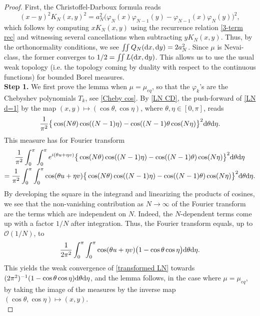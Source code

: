 \documentclass[a4paper,11pt]{article}
\numberwithin{equation}{section}
\theoremstyle{definition}
\newcommand{\rev}[1]{#1}
\newcommand{\eq}{\begin{equation}}
\newcommand{\qe}{\end{equation}}
\newcommand{\cO}{\mathcal{O}}
\renewcommand{\phi}{\varphi}
\renewcommand{\d}{ {\rm d}}
\begin{document}
\begin{proof} First, the Christoffel-Darboux formula reads
\eq
\label{LN CD}
(x-y)^2K_N(x,y)^2= a_N^2\big(\phi_N(x)\phi_{N-1}(y)-\phi_{N-1}(x)\phi_N(y)\big)^2,
\qe
\rev{which follows by computing $xK_N(x,y)$ using the recurrence relation \eqref{3-term rec} and witnessing several cancellations when subtracting $yK_N(x,y)$}.
Thus, by the orthonormality conditions, we see $\iint Q_N(\d x,\d y)= 2a_N^2$. Since $\mu$ is Nevai-class, the former converges to $1/2=\iint L(\d x,\d y)$. This allows us to use the usual weak topology (i.e. the topology coming by duality with respect to the continuous functions) for bounded Borel measures. \\


\noindent \textbf{Step 1.} We first prove the lemma when $\mu=\mu_{eq}$, so that the $\phi_k$'s are the Chebyshev polynomials $T_k$, see \eqref{Cheby cos}. By \eqref{LN CD}, the push-forward of \eqref{LN d=1} by the map $(x,y)\mapsto(\cos\theta,\cos\eta)$, where $\theta,\eta\in[0,\pi]$, reads
\eq
\label{transformed LN}
\frac1{\pi^2} \big\{\cos(N\theta)\cos((N-1)\eta)- \cos((N-1)\theta\cos(N\eta)\big\}^2\d\theta\d\eta.
\qe
This measure  has for Fourier transform
\begin{multline*}
\frac1{\pi^2} \int_0^\pi\int_0^\pi e^{i(\theta u+ \eta v)}\big\{\cos( N\theta)\cos((N-1)\eta)- \cos((N-1)\theta)\cos(N\eta)\big\}^2\d\theta\d\eta\\
= \frac1{\pi^2} \int_0^\pi\int_0^\pi\cos(\theta u+ \eta v)\big\{\cos( N\theta)\cos((N-1)\eta)- \cos((N-1)\theta)\cos(N\eta)\big\}^2\d\theta\d\eta.
\end{multline*}
By developing the square in the integrand and linearizing the products of
cosines, we see that the non-vanishing contribution  as $N\to\infty$ of the
Fourier transform are the terms which are independent on $N$. Indeed, the $N$-dependent terms come up with a factor $1/N$ after integration. Thus, the Fourier transform equals, up to $\cO(1/N)$, to
$$
\frac1{2\pi^2} \int_0^\pi\int_0^\pi\cos(\theta u+ \eta v)\big(1-\cos\theta\cos\eta\big)\d\theta\d\eta.
$$
This yields the weak convergence of \eqref{transformed LN} towards $(2\pi^2)^{-1}(1-\cos\theta\cos\eta)\d\theta\d\eta$, and the lemma follows, in the  case where  $\mu=\mu_{eq}$, by taking the image of the measures by the inverse map $(\cos\theta,\cos\eta)\mapsto(x,y)$.\\


\end{proof}
\end{document}
